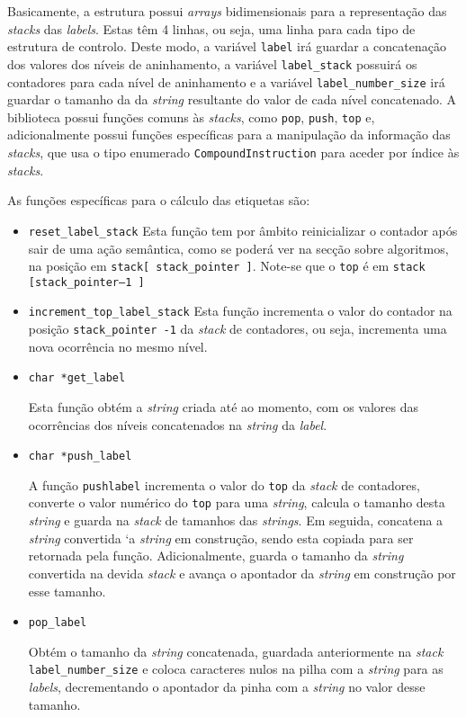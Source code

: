 Basicamente, a estrutura possui \emph{arrays} bidimensionais para
a representação das \emph{stacks} das \emph{labels}. Estas têm 4 linhas, ou
seja, uma linha para cada tipo de estrutura de controlo. Deste modo, a variável
\texttt{label} irá guardar a concatenação dos valores dos níveis de aninhamento,
a variável \texttt{label\_stack} possuirá os contadores para cada nível de
aninhamento e a variável \texttt{label\_number\_size} irá guardar o tamanho da
da \emph{string} resultante do valor de cada nível concatenado. A biblioteca
possui funções comuns às \emph{stacks}, como \texttt{pop}, \texttt{push},
\texttt{top} e, adicionalmente possui funções específicas para a manipulação da
informação das \emph{stacks}, que usa o tipo enumerado
\texttt{CompoundInstruction} para aceder por índice às \emph{stacks}.   

As funções específicas para o cálculo das etiquetas são:

\begin{itemize}
\item \verb|reset_label_stack|
Esta função tem por âmbito reinicializar o contador após sair de uma ação 
semântica, como se poderá ver na secção sobre algoritmos, na posição em 
\texttt{stack[ stack\_pointer ]}. Note-se que o \texttt{top} é em \texttt{stack
[stack\_pointer--1 ]} 

  \item \verb|increment_top_label_stack|
Esta função incrementa o valor do contador na posição \texttt{stack\_pointer
-1} da \emph{stack} de contadores, ou seja, incrementa uma nova ocorrência
no mesmo nível.

  \item \verb|char *get_label|              

Esta função obtém a \emph{string} criada até ao momento, com os valores das
ocorrências dos níveis concatenados na \emph{string} da \emph{label}.  

  \item \verb|char *push_label|             

A função \texttt{push\-label} incrementa o valor do \texttt{top} da
\emph{stack} de contadores,   converte o valor numérico do \texttt{top} para
uma \emph{string}, calcula o tamanho desta \emph{string} e guarda na
\emph{stack} de tamanhos das \emph{strings}. Em seguida, concatena
a \emph{string} convertida `a \emph{string} em construção, sendo esta
copiada para ser retornada pela função. Adicionalmente, guarda o 
tamanho da \emph{string} convertida na devida \emph{stack} e avança
o apontador da \emph{string} em construção por esse tamanho.  

  \item \verb|pop_label|                    

Obtém o tamanho da \emph{string} concatenada, guardada anteriormente na
\emph{stack} \texttt{label\_number\_size} e coloca caracteres nulos na pilha
com a \emph{string} para as \emph{labels}, decrementando o apontador da
pinha com a \emph{string} no valor desse tamanho. 

\end{itemize}


